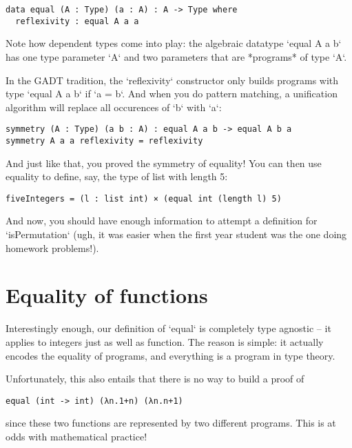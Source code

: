 \begin{lstlisting}[style=kaolstplain,linewidth=1.5\textwidth]
data equal (A : Type) (a : A) : A -> Type where
  reflexivity : equal A a a
\end{lstlisting}

Note how dependent types come into play: the algebraic datatype `equal A a b`
has one type parameter `A` and two parameters that are *programs* of type `A`.

In the GADT tradition, the `reflexivity` constructor only builds programs with
type `equal A a b` if `a = b`. And when you do pattern matching, a unification
algorithm will replace all occurences of `b` with `a`:

\begin{lstlisting}[style=kaolstplain,linewidth=1.5\textwidth]
symmetry (A : Type) (a b : A) : equal A a b -> equal A b a
symmetry A a a reflexivity = reflexivity
\end{lstlisting}

And just like that, you proved the symmetry of equality!
You can then use equality to define, say, the type of list with length 5:

\begin{lstlisting}[style=kaolstplain,linewidth=1.5\textwidth]
fiveIntegers = (l : list int) × (equal int (length l) 5)
\end{lstlisting}

And now, you should have enough information to attempt a definition for `isPermutation`
(ugh, it was easier when the first year student was the one doing homework problems!).

\section{Equality of functions}

Interestingly enough, our definition of `equal` is completely type agnostic -- it
applies to integers just as well as function. The reason is simple: it actually
encodes the equality of programs, and everything is a program in type theory.

Unfortunately, this also entails that there is no way to build a proof of

\begin{lstlisting}[style=kaolstplain,linewidth=1.5\textwidth]
equal (int -> int) (λn.1+n) (λn.n+1)
\end{lstlisting}

since these two functions are represented by two different programs. This is
at odds with mathematical practice!

